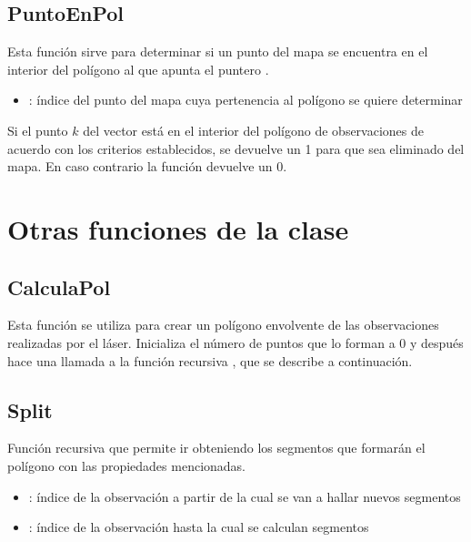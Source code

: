 \subsection{PuntoEnPol}\label{PuntoEnPol}


Esta función sirve para determinar si un punto del mapa se encuentra en el interior del polígono al que apunta el puntero .

\begin{itemize}
  \item {}: índice del punto del mapa cuya pertenencia al polígono se quiere determinar
\end{itemize}

Si el punto $k$ del vector  está en el interior del polígono de observaciones de acuerdo con los criterios establecidos, se devuelve un 1 para que sea eliminado del mapa. En caso contrario la función devuelve un 0.


\section { Otras funciones de la clase }


\subsection {CalculaPol}


Esta función se utiliza para crear un polígono envolvente de las observaciones realizadas por el láser.
Inicializa el número de puntos que lo forman a 0 y después hace una llamada a la función recursiva , que se describe a continuación.

\subsection {Split}


Función recursiva que permite ir obteniendo los segmentos que formarán el polígono con las propiedades mencionadas.

\begin{itemize}
  \item {}: índice de la observación a partir de la cual se van a hallar nuevos segmentos
  \item {}: índice de la observación hasta la cual se calculan segmentos
\end{itemize}

